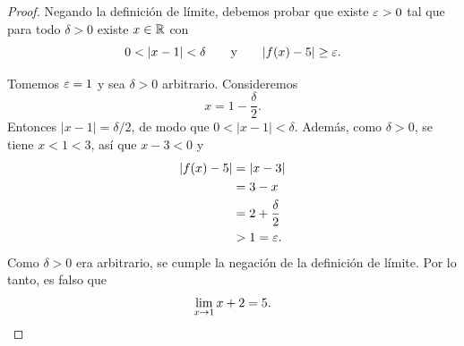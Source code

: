 \documentclass[12pt,a4paper]{article}
\begin{document}
    \begin{proof}
        Negando la definición de límite, debemos probar que existe $\varepsilon>0$ tal que para todo $\delta>0$ existe $x\in\mathbb{R}$ con
        \begin{equation*}
            0<|x-1|<\delta\qquad\text{y}\qquad|f(x)-5|\geq\e.
        \end{equation*}

        Tomemos $\varepsilon=1$ y sea $\delta>0$ arbitrario. Consideremos
        \begin{equation*}
            x=1-\frac{\delta}{2}.
        \end{equation*}
        Entonces $|x-1|=\delta/2$, de modo que $0<|x-1|<\delta$. Además, como $\delta>0$, se tiene $x<1<3$, así que $x-3<0$ y
        \begin{align*}
            |f(x)-5|&=|x-3|\\
            &=3-x\\
            &=2+\frac{\delta}{2}\\
            &>1=\varepsilon.
        \end{align*}
        Como $\delta>0$ era arbitrario, se cumple la negación de la definición de límite. Por lo tanto, es falso que
        \begin{equation*}
            \lim_{x\to1}x+2=5.\qedhere
        \end{equation*}
    \end{proof}
    
\end{document}
